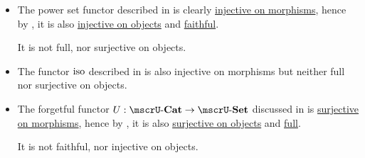 \begin{example}\label{ex:def:functor_invertibility}
  \hfill
  \begin{itemize}
    \item The power set functor described in  is clearly \hyperref[def:functor_invertibility/injective_on_morphisms]{injective on morphisms}, hence by , it is also \hyperref[def:functor_invertibility/injective_on_objects]{injective on objects} and \hyperref[def:functor_invertibility/faithful]{faithful}.

    It is not full, nor surjective on objects.

    \item The functor \( \operatorname{iso} \) described in  is also injective on morphisms but neither full nor surjective on objects.

    \item The forgetful functor \( U: \ucat{Cat} \to \ucat{Set} \) discussed in  is \hyperref[def:functor_invertibility/surjective_on_morphisms]{surjective on morphisms}, hence by , it is also \hyperref[def:functor_invertibility/surjective_on_objects]{surjective on objects} and \hyperref[def:functor_invertibility/full]{full}.

    It is not faithful, nor injective on objects.
  \end{itemize}
\end{example}

